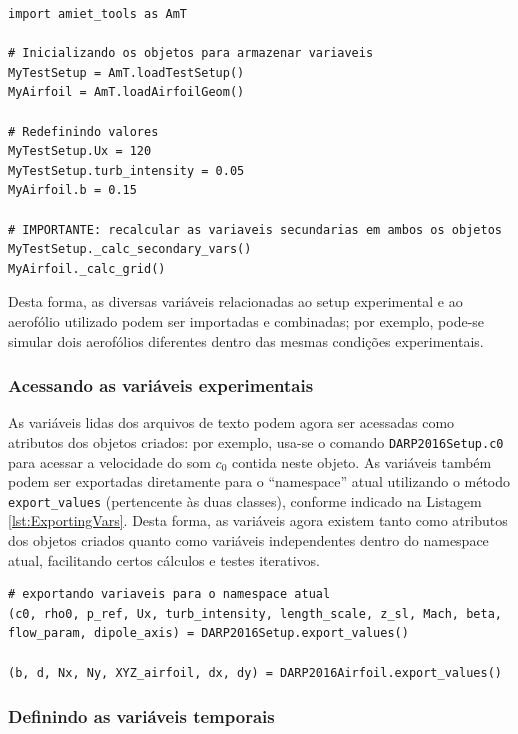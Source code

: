 \documentclass[a4paper, 11pt, twoside]{article}
\begin{document}
\begin{lstlisting}[caption={Método alternativo para carregar variáveis},label={lst:AltLoadingVars}]
import amiet_tools as AmT

# Inicializando os objetos para armazenar variaveis
MyTestSetup = AmT.loadTestSetup()
MyAirfoil = AmT.loadAirfoilGeom()

# Redefinindo valores
MyTestSetup.Ux = 120
MyTestSetup.turb_intensity = 0.05
MyAirfoil.b = 0.15

# IMPORTANTE: recalcular as variaveis secundarias em ambos os objetos
MyTestSetup._calc_secondary_vars()
MyAirfoil._calc_grid()
\end{lstlisting}

Desta forma, as diversas variáveis relacionadas ao setup experimental e ao aerofólio utilizado podem ser importadas e combinadas; por exemplo, pode-se simular dois aerofólios diferentes dentro das mesmas condições experimentais. 


\subsubsection{Acessando as variáveis experimentais}

As variáveis lidas dos arquivos de texto podem agora ser acessadas como atributos dos objetos criados: por exemplo, usa-se o comando \verb|DARP2016Setup.c0| para acessar a velocidade do som $c_0$ contida neste objeto. As variáveis também podem ser exportadas diretamente para o ``namespace'' atual utilizando o método \verb|export_values| (pertencente às duas classes), conforme indicado na Listagem \ref{lst:ExportingVars}. Desta forma, as variáveis agora existem tanto como atributos dos objetos criados quanto como variáveis independentes dentro do namespace atual, facilitando certos cálculos e testes iterativos.

\begin{lstlisting}[caption={Exportando as variáveis para o ``namespace'' atual},label={lst:ExportingVars}]
# exportando variaveis para o namespace atual
(c0, rho0, p_ref, Ux, turb_intensity, length_scale, z_sl, Mach, beta,
flow_param, dipole_axis) = DARP2016Setup.export_values()

(b, d, Nx, Ny, XYZ_airfoil, dx, dy) = DARP2016Airfoil.export_values()
\end{lstlisting}

\subsubsection{Definindo as variáveis temporais}
\end{document}

